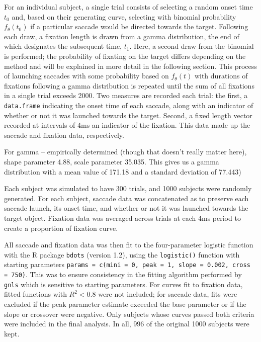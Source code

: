 \documentclass{article}
\newcommand{\xt}{\texttt}%
\begin{document}
For an individual subject, a single trial consists of selecting a random onset time $t_0$ and, based on their generating curve, selecting with binomial probability $f_{\theta}(t_0)$ if a particular saccade would be directed towards the target. Following each draw, a fixation length is drawn from a gamma distribution, the end of which designates the subsequent time, $t_1$. Here, a second draw from the binomial is performed; the probability of fixating on the target differs depending on the method and will be explained in more detail in the following section. This process of launching saccades with some probability based on $f_{\theta}(t)$ with durations of fixations following a gamma distribution is repeated until the sum of all fixations in a single trial exceeds 2000. Two measures are recorded each trial: the first, a \xt{data.frame} indicating the onset time of each saccade, along with an indicator of whether or not it was launched towards the target. Second, a fixed length vector recorded at intervals of 4ms an indicator of the fixation. This data made up the saccade and fixation data, respectively.

For gamma -- empirically determined (though that doesn't really matter here), shape parameter 4.88, scale parameter 35.035. This gives us a gamma distribution with a mean value of 171.18 and a standard deviation of 77.443)

Each subject was simulated to have 300 trials, and 1000 subjects were randomly generated. For each subject, saccade data was concatenated as to preserve each saccade launch, its onset time, and whether or not it was launched towards the target object. Fixation data was averaged across trials at each 4ms period to create a proportion of fixation curve.

All saccade and fixation data was then fit to the four-parameter logistic function with the R package \xt{bdots} (version 1.2), using the \xt{logistic()} function with starting parameters \xt{params = c(mini = 0, peak = 1, slope = 0.002, cross = 750)}. This was to ensure consistency in the fitting algorithm performed by \xt{gnls} which is sensitive to starting parameters. For curves fit to fixation data, fitted functions with $R^2 < 0.8$ were not included; for saccade data, fits were excluded if the peak parameter estimate exceeded the base parameter or if the slope or crossover were negative. Only subjects whose curves passed both criteria were included in the final analysis. In all, 996 of the original 1000 subjects were kept.
\end{document}
